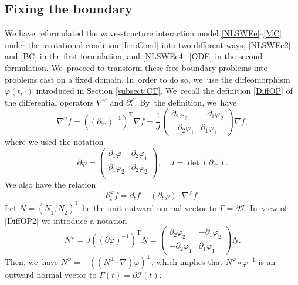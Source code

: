 \documentclass[10pt]{amsart}
\newcommand{\dt}{\partial_t}
\newcommand{\cI}{{\mathcal I}}
\newcommand{\ul}[1]{\underline{#1}}
\newcommand{\itGamma}{\mathit{\Gamma}}
\theoremstyle{definition}
\begin{document}
\subsection{Fixing the boundary}\label{sectfixing}
We have reformulated the wave-structure interaction model \eqref{NLSWEe}--\eqref{MC} under the irrotational condition \eqref{IrroCond} into two different ways;
\eqref{NLSWEe2} and \eqref{BC} in the first formulation, and \eqref{NLSWEe4}--\eqref{ODE} in the second formulation. We~proceed to transform these free boundary problems into problems cast on a fixed domain. In~order to do so, we~use the diffeomorphism $\varphi(t,\cdot)$ introduced in Section \ref{subsect:CT}. We~recall the definition \eqref{DiffOP} of the differential operators $\nabla^\varphi$ and $\dt^\varphi$. By~the definition, we~have
\begin{equation}\label{DiffOP2}
\nabla^\varphi f
= ((\partial\varphi)^{-1})^\mathrm{T}\nabla f
= \frac{1}{J}
\begin{pmatrix}
\partial_2\varphi_2 & -\partial_1\varphi_2 \\
-\partial_2\varphi_1 & \partial_1\varphi_1
\end{pmatrix}
\nabla f,
\end{equation}
where we used the notation
\[
\partial\varphi
= \begin{pmatrix}
\partial_1\varphi_1 & \partial_2\varphi_1 \\
\partial_1\varphi_2 & \partial_2\varphi_2 \\
\end{pmatrix}, \quad
J = \det(\partial\varphi).
\]
We also have the relation
\begin{equation}\label{DiffOP3}
\dt^\varphi f = \dt f - (\dt \varphi)\cdot\nabla^\varphi f.
\end{equation}
Let $\ul{N} = (\ul{N}_1,\ul{N}_2)^\mathrm{T}$ be the unit outward normal vector to $\ul{\itGamma}=\partial\ul{\cI}$. In~view of \eqref{DiffOP2} we introduce a notation
\begin{equation}\label{Nphi}
N^\varphi = J((\partial\varphi)^{-1})^\mathrm{T}\ul{N} =
\begin{pmatrix}
\partial_2\varphi_2 & -\partial_1\varphi_2 \\
-\partial_2\varphi_1 & \partial_1\varphi_1
\end{pmatrix}
\ul{N}.
\end{equation}
Then, we~have $N^\varphi = -((\ul{N}^{\perp}\cdot\nabla)\varphi)^\perp$,
which implies that $N^\varphi\circ\varphi^{-1}$ is an outward normal vector to $\itGamma(t)= \partial\cI(t)$.
\end{document}
